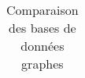 \begin{table}[htb!]
  \centering
  \begin{tabular}{|lcccc|}
  \end{tabular}
  \newline
  \caption{Comparaison des bases de données graphes}
  \label{tab:graphdb-comp}
\end{table}

